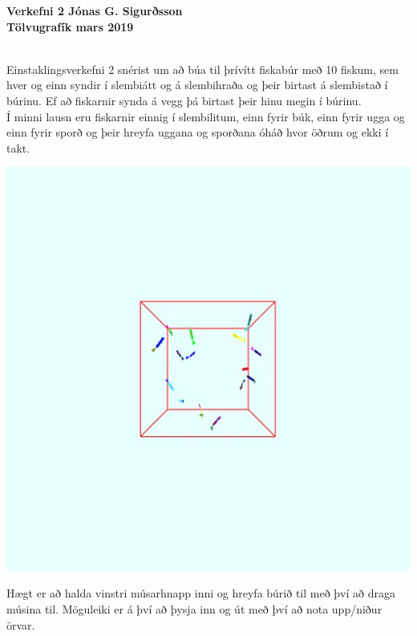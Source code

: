 \documentclass[12pt]{article}
\begin{document}
\noindent \large \textbf{Verkefni 2 \hfill Jónas G. Sigurðsson\\
\noindent Tölvugrafík \hfill 
\normalsize  \hfill mars 2019}\\\\
\begin{small}

\begin{spacing}{2}
\end{spacing}

Einstaklingsverkefni 2 snérist um að búa til þrívítt fiskabúr með 10 fiskum, sem hver og einn syndir í slembiátt og á slembihraða og þeir birtast á slembistað í búrinu. Ef að fiskarnir synda á vegg þá birtast þeir hinu megin í búrinu.\\

Í minni lausn eru fiskarnir einnig í slembilitum, einn fyrir búk, einn fyrir ugga og einn fyrir sporð og þeir hreyfa uggana og sporðana óháð hvor öðrum og ekki í takt.
\begin{center}
\includegraphics[scale=0.5]{1}
\end{center}
Hægt er að halda vinstri músarhnapp inni og hreyfa búrið til með því að draga músina til. Möguleiki er á því að þysja inn og út með því að nota upp/niður örvar.
\begin{center}

\end{center}
\end{small}
\end{document}
